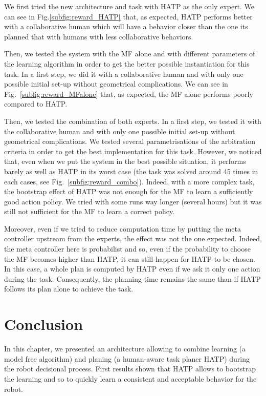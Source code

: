 \documentclass[english,a4paper,11pt,twoside]{StyleThese}
\begin{document}
We first tried the new architecture and task with HATP as the only expert. We can see in Fig.\ref{subfig:reward_HATP} that, as expected, HATP performs better with a collaborative human which will have a behavior closer than the one its planned that with humans with less collaborative behaviors. 

Then, we tested the system with the MF alone and with different parameters of the learning algorithm in order to get the better possible instantiation for this task. In a first step, we did it with a collaborative human and with only one possible initial set-up without geometrical complications. We can see in Fig.~\ref{subfig:reward_MFalone} that, as expected, the MF alone performs poorly compared to HATP.

Then, we tested the combination of both experts. In a first step, we tested it with the collaborative human and with only one possible initial set-up without geometrical complications. We tested several parametrisations of the arbitration criteria in order to get the best implementation for this task. However, we noticed that, even when we put the system in the best possible situation, it performs barely as well as HATP in its worst case (the task was solved around 45 times in each cases, see Fig.~\ref{subfig:reward_combo}). Indeed, with a more complex task, the bootstrap effect of HATP was not enough for the MF to learn a sufficiently good action policy. We tried with some runs way longer (several hours) but it was still not sufficient for the MF to learn a correct policy. 

Moreover, even if we tried to reduce computation time by putting the meta controller upstream from the experts, the effect was not the one expected. Indeed, the meta controller here is probabilist and so, even if the probability to choose the MF becomes higher than HATP, it can still happen for HATP to be chosen. In this case, a whole plan is computed by HATP even if we ask it only one action during the task. Consequently, the planning time remains the same than if HATP follows its plan alone to achieve the task.

\section{Conclusion}

In this chapter, we presented an architecture allowing to combine learning (a model free algorithm) and planing (a human-aware task planer HATP) during the robot decisional process. First results shown that HATP allows to bootstrap the learning and so to quickly learn a consistent and acceptable behavior for the robot.
\end{document}
